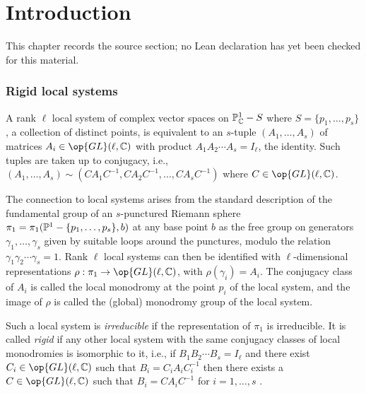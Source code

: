 \chapter{Introduction}
\label{rigid-local-systems-multiplicative-eigenvalue-problem-chapter-01}

\begin{remark}
\label{rigid-local-systems-multiplicative-eigenvalue-problem-chapter-01-source}
This chapter records the source section; no Lean declaration has yet been checked for this material.
\notready
\end{remark}

\subsection{Rigid local systems}
A rank $\ell$ local system of complex vector spaces on $\Bbb{P}^1_{\Bbb{C}}-S$ where $S=\{p_1,\dots,p_s\}$, a collection of distinct points,  is equivalent to an $s$-tuple $(A_1,\dots,A_s)$ of matrices $A_i\in \op{GL}(\ell,\Bbb{C})$ with product $A_1A_2\cdots A_s= I_{\ell}$, the identity. Such tuples are taken up to conjugacy, i.e.,  $(A_1,\dots,A_s)\sim (CA_1C^{-1}, CA_2C^{-1},\dots, CA_sC^{-1})$ where $C\in  \op{GL}(\ell,\Bbb{C})$.

The connection to local systems arises from the standard description of the fundamental group of an $s$-punctured Riemann sphere $\pi_1=\pi_1(\Bbb{P}^1-\{p_1,\dots,p_s\},b)$ at any base point $b$ as the free group on generators $\gamma_{1},\dots,\gamma_{s}$ given by suitable loops around the punctures, modulo the relation $\gamma_{1}\gamma_{2}\cdots\gamma_s=1$.  Rank $\ell$ local systems can then be identified with $\ell$-dimensional representations $\rho:\pi_1\to \op{GL}(\ell,\Bbb{C})$, with $\rho(\gamma_i)=A_i$. The conjugacy class of $A_i$ is
called the local monodromy at the point $p_i$ of the local system, and the image of $\rho$ is called  the (global) monodromy group of the local system.

Such a local system is {\em irreducible} if the representation of $\pi_1$ is irreducible. It is called {\em rigid} if any other local system with the same conjugacy classes of  local monodromies is isomorphic to it, i.e., if
$B_1B_2\cdots B_s=I_{\ell}$ and there exist $C_i\in \op{GL}(\ell,\Bbb{C})$ such that $B_i=C_iA_iC_i^{-1}$ then there exists a $C\in \op{GL}(\ell,\Bbb{C})$ such that $B_i=CA_iC^{-1}$ for $i=1,\dots,s$ \cite{Katz}.

